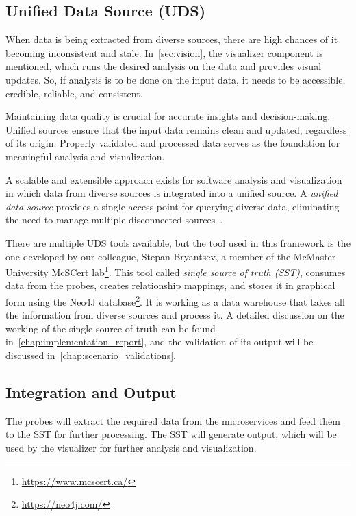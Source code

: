 \subsection{Unified Data Source (UDS)}\label{sec:component-sst}

When data is being extracted from diverse sources, there are high chances of it becoming inconsistent and stale. In~\autoref{sec:vision}, the visualizer component is mentioned, which runs the desired analysis on the data and provides visual updates. So, if analysis is to be done on the input data, it needs to be accessible, credible, reliable, and consistent.

Maintaining data quality is crucial for accurate insights and decision-making. Unified sources ensure that the input data remains clean and updated, regardless of its origin. Properly validated and processed data serves as the foundation for meaningful analysis and visualization.

A scalable and extensible approach exists for software analysis and visualization in which data from diverse sources is integrated into a unified source. A \textit{unified data source} provides a single access point for querying diverse data, eliminating the need to manage multiple disconnected sources~\citep{MullerUdsforSA2018}.

There are multiple UDS tools available, but the tool used in this framework is the one developed by our colleague, Stepan Bryantsev, a member of the McMaster University McSCert lab\footnote{\url{https://www.mcscert.ca/}}. This tool called \textit{single source of truth (SST)}, consumes data from the probes, creates relationship mappings, and stores it in graphical form using the Neo4J database\footnote{\url{https://neo4j.com/}}. It is working as a data warehouse that takes all the information from diverse sources and process it. A detailed discussion on the working of the single source of truth can be found in~\autoref{chap:implementation_report}, and the validation of its output will be discussed in~\autoref{chap:scenario_validations}.

\subsection{Integration and Output}

The probes will extract the required data from the microservices and feed them to the SST for further processing. The SST will generate output, which will be used by the visualizer for further analysis and visualization.


